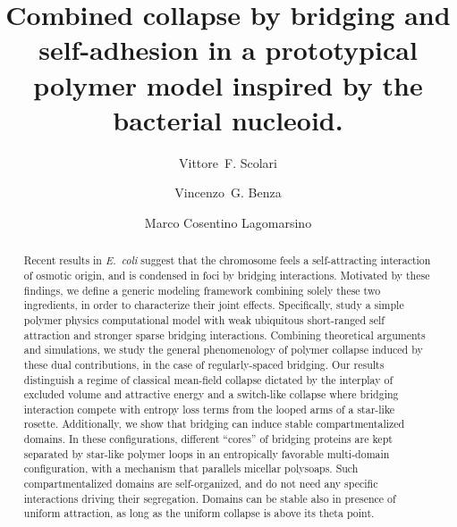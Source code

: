 \documentclass[
preprint,
a4paper,
12pt,
superscriptaddress,
pre]{revtex4}
\begin{document}
 

\title{Combined collapse by bridging and self-adhesion in a
  prototypical polymer model inspired by the bacterial nucleoid.}

\author{Vittore~F. Scolari}
%
%
%
% 
%
\author{Vincenzo~G. Benza}
%
%
\author{Marco Cosentino Lagomarsino}
%

\begin{abstract}
  Recent results in \emph{E.~coli} suggest that the chromosome feels a
  self-attracting interaction of osmotic origin, and is condensed in
  foci by bridging interactions.
  Motivated by these findings, we define a generic modeling framework
  combining solely these two ingredients, in order to characterize
  their joint effects. Specifically, study a simple polymer physics
  computational model with weak ubiquitous short-ranged self
  attraction and stronger sparse bridging interactions.  Combining
  theoretical arguments and simulations, we study the general
  phenomenology of polymer collapse induced by these dual
  contributions, in the case of regularly-spaced bridging.
%
  Our results distinguish a regime of classical mean-field collapse
  dictated by the interplay of excluded volume and attractive energy
  and a switch-like collapse where bridging interaction compete with
  entropy loss terms from the looped arms of a star-like rosette.
%
  Additionally, we show that bridging can induce stable
  compartmentalized domains. In these configurations, different
  ``cores'' of bridging proteins are kept separated by star-like
  polymer loops in an entropically favorable multi-domain
  configuration, with a mechanism that parallels micellar polysoaps.
  Such compartmentalized domains are self-organized, and do not need
  any specific interactions driving their segregation.  Domains can be
  stable also in presence of uniform attraction, as long as the
  uniform collapse is above its theta point.
\end{abstract}
\end{document}
